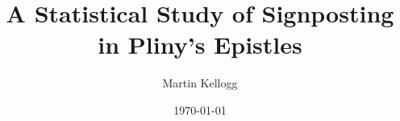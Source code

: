 \documentclass[11pt,twocolumn]{article}
\begin{document}
\title{A Statistical Study of Signposting in Pliny's Epistles}

\author{Martin Kellogg}

\date{\today}

\maketitle





\end{document}
